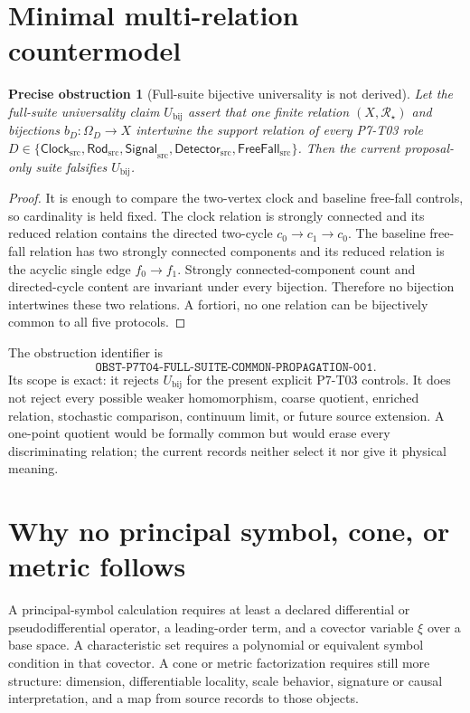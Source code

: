 \documentclass[11pt]{article}
\newtheorem{obstruction}{Precise obstruction}
\newcommand{\Src}{\mathrm{src}}
\newcommand{\Rel}{\mathcal R}
\newcommand{\Clock}{\mathsf{Clock}_{\Src}}
\newcommand{\Rod}{\mathsf{Rod}_{\Src}}
\newcommand{\Signal}{\mathsf{Signal}_{\Src}}
\newcommand{\Detector}{\mathsf{Detector}_{\Src}}
\newcommand{\FreeFall}{\mathsf{FreeFall}_{\Src}}
\begin{document}
\section{Minimal multi-relation countermodel}

\begin{obstruction}[Full-suite bijective universality is not derived]
\label{obst:universal}
Let the full-suite universality claim \(U_{\mathrm{bij}}\) assert that one
finite relation \((X,\Rel_\star)\) and bijections
\(b_D:\Omega_D\to X\) intertwine the support relation of every P7-T03 role
\(D\in\{\Clock,\Rod,\Signal,\Detector,\FreeFall\}\).
Then the current proposal-only suite falsifies \(U_{\mathrm{bij}}\).
\end{obstruction}

\begin{proof}
It is enough to compare the two-vertex clock and baseline free-fall
controls, so cardinality is held fixed.  The clock relation is strongly
connected and its reduced relation contains the directed two-cycle
\(c_0\to c_1\to c_0\).  The baseline free-fall relation has two strongly
connected components and its reduced relation is the acyclic single edge
\(f_0\to f_1\).  Strongly connected-component count and directed-cycle
content are invariant under every bijection.  Therefore no bijection
intertwines these two relations.  A fortiori, no one relation can be
bijectively common to all five protocols.
\end{proof}

The obstruction identifier is
\[
 \texttt{OBST-P7T04-FULL-SUITE-COMMON-PROPAGATION-001}.
\]
Its scope is exact: it rejects \(U_{\mathrm{bij}}\) for the present explicit
P7-T03 controls.  It does not reject every possible weaker homomorphism,
coarse quotient, enriched relation, stochastic comparison, continuum limit,
or future source extension.  A one-point quotient would be formally common
but would erase every discriminating relation; the current records neither
select it nor give it physical meaning.

\section{Why no principal symbol, cone, or metric follows}

A principal-symbol calculation requires at least a declared differential or
pseudodifferential operator, a leading-order term, and a covector variable
\(\xi\) over a base space.  A characteristic set requires a polynomial or
equivalent symbol condition in that covector.  A cone or metric
factorization requires still more structure: dimension, differentiable
locality, scale behavior, signature or causal interpretation, and a map from
source records to those objects.
\end{document}
